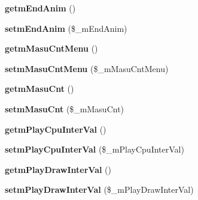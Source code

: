 \begin{DoxyCompactItemize}
\item 
{\bfseries getm\+End\+Anim} ()\hypertarget{class_reversi_setting_a9c96042c1a1c482e4083d5aff613974a}{}\label{class_reversi_setting_a9c96042c1a1c482e4083d5aff613974a}

\item 
{\bfseries setm\+End\+Anim} (\$\+\_\+m\+End\+Anim)\hypertarget{class_reversi_setting_aa999b168a52630ff1e339e8131589f36}{}\label{class_reversi_setting_aa999b168a52630ff1e339e8131589f36}

\item 
{\bfseries getm\+Masu\+Cnt\+Menu} ()\hypertarget{class_reversi_setting_a7c7134b5c9b4920861676c8aa65fc8bf}{}\label{class_reversi_setting_a7c7134b5c9b4920861676c8aa65fc8bf}

\item 
{\bfseries setm\+Masu\+Cnt\+Menu} (\$\+\_\+m\+Masu\+Cnt\+Menu)\hypertarget{class_reversi_setting_a124deeade23c86db5106d01abd2816d3}{}\label{class_reversi_setting_a124deeade23c86db5106d01abd2816d3}

\item 
{\bfseries getm\+Masu\+Cnt} ()\hypertarget{class_reversi_setting_a32cebf699f9aa19d9053c143c3562d3a}{}\label{class_reversi_setting_a32cebf699f9aa19d9053c143c3562d3a}

\item 
{\bfseries setm\+Masu\+Cnt} (\$\+\_\+m\+Masu\+Cnt)\hypertarget{class_reversi_setting_ad50e5fa90e6a2f53bf71ed04bed603ae}{}\label{class_reversi_setting_ad50e5fa90e6a2f53bf71ed04bed603ae}

\item 
{\bfseries getm\+Play\+Cpu\+Inter\+Val} ()\hypertarget{class_reversi_setting_a396427325eccd710236622c2122aef39}{}\label{class_reversi_setting_a396427325eccd710236622c2122aef39}

\item 
{\bfseries setm\+Play\+Cpu\+Inter\+Val} (\$\+\_\+m\+Play\+Cpu\+Inter\+Val)\hypertarget{class_reversi_setting_a7e66c7132df49665538ba0e474f84134}{}\label{class_reversi_setting_a7e66c7132df49665538ba0e474f84134}

\item 
{\bfseries getm\+Play\+Draw\+Inter\+Val} ()\hypertarget{class_reversi_setting_a2348e916349e5ff56f02981f5b828c64}{}\label{class_reversi_setting_a2348e916349e5ff56f02981f5b828c64}

\item 
{\bfseries setm\+Play\+Draw\+Inter\+Val} (\$\+\_\+m\+Play\+Draw\+Inter\+Val)\hypertarget{class_reversi_setting_aa75e022ea7334a71d2c05a5595636d33}{}\label{class_reversi_setting_aa75e022ea7334a71d2c05a5595636d33}


\end{DoxyCompactItemize}
